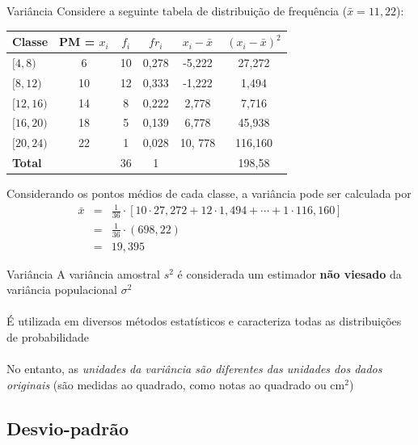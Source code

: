 \documentclass[10pt]{beamer}\usepackage[]{graphicx}\usepackage[]{color}
\theoremstyle{definition}
\begin{document}
\begin{frame}{Variância}
  Considere a seguinte tabela de distribuição de frequência ($\bar{x} = 11,22$):
    \begin{table}[h]
    \centering
    \begin{tabular}{lccccc}
      \hline
      \textbf{Classe} & \textbf{PM = $x_i$} & \textbf{$f_i$}
      & \textbf{$fr_i$} & \textbf{$x_i - \bar{x}$} & \textbf{$(x_i - \bar{x})^2$} \\
      \hline
      $[4,8)$ & 6 & 10 & 0,278 & -5,222 & 27,272 \\
      $[8,12)$ & 10 & 12 & 0,333 & -1,222 & 1,494 \\
      $[12,16)$ & 14 & 8 & 0,222 & 2,778 & 7,716 \\
      $[16,20)$ & 18 & 5 & 0,139 & 6,778 & 45,938 \\
      $[20,24)$ & 22 & 1 & 0,028 & 10, 778 & 116,160 \\
      \hline
      \textbf{Total} & & 36 & 1 & & 198,58 \\
      \hline
    \end{tabular}
  \end{table}
  Considerando os pontos médios de cada classe, a variância pode ser calculada por
    \begin{eqnarray*}
    \bar{x} &=& \frac{1}{36} \cdot [10 \cdot 27,272 + 12 \cdot 1,494 +
                \cdots + 1 \cdot 116,160]\\
            &=& \frac{1}{36} \cdot (698,22)\\
            &=& 19,395
  \end{eqnarray*}
\end{frame}



\begin{frame}{Variância}
  A variância amostral $s^2$ é considerada um estimador \textbf{não viesado}
  da variância populacional $\sigma^2$ \\~\\
  É utilizada em diversos métodos estatísticos e caracteriza todas as
  distribuições de probabilidade \\~\\
  No entanto, as \textsl{unidades da variância são diferentes das
    unidades dos dados originais} (são medidas ao quadrado, como notas
  ao quadrado ou cm$^2$)
\end{frame}

\subsection{Desvio-padrão}
\end{document}
